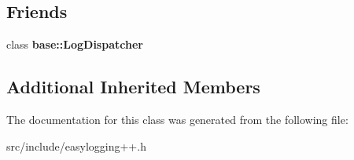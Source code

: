 \subsection*{Friends}
\begin{DoxyCompactItemize}
\item 
\mbox{\label{classel_1_1_log_dispatch_callback_a84d22f9ad5b796e49ff5f15a8c32773d}} 
class {\bfseries base\+::\+Log\+Dispatcher}
\end{DoxyCompactItemize}
\subsection*{Additional Inherited Members}


The documentation for this class was generated from the following file\+:\begin{DoxyCompactItemize}
\item 
src/include/easylogging++.\+h\end{DoxyCompactItemize}
